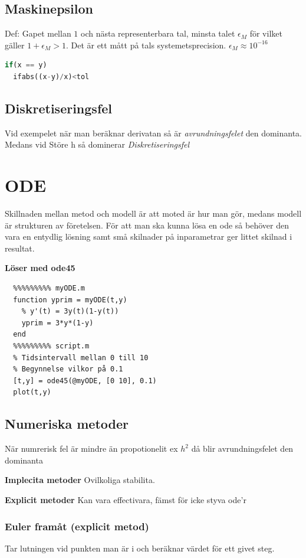 \documentclass{article}
\begin{document}
\subsection{Maskinepsilon}
Def: Gapet mellan $1$ och nästa representerbara tal, minsta talet $\epsilon_M$ för vilket
gäller $1+\epsilon_M > 1$. Det är ett mått på tals systemetsprecision. $\epsilon_M \approx 10^{-16}$

\begin{lstlisting}[language=Python]
  if(x == y)
  ifabs((x-y)/x)<tol
\end{lstlisting}

\subsection{Diskretiseringsfel}
Vid exempelet när man beräknar derivatan så är \textit{avrundningsfelet} den dominanta. Medans
vid Störe h så dominerar \textit{Diskretiseringsfel}

\newpage
\section{ODE}
Skillnaden mellan metod och modell är att moted är hur man gör, 
medans modell är strukturen av företelsen.
För att man ska kunna lösa en ode så behöver den vara en entydlig 
lösning samt små skilnader på inparametrar ger littet skilnad i resultat.

\textbf{Löser med ode45}
\begin{verbatim}
  %%%%%%%%% myODE.m
  function yprim = myODE(t,y)
    % y'(t) = 3y(t)(1-y(t))
    yprim = 3*y*(1-y)
  end
  %%%%%%%%% script.m
  % Tidsintervall mellan 0 till 10
  % Begynnelse vilkor på 0.1
  [t,y] = ode45(@myODE, [0 10], 0.1)
  plot(t,y)
\end{verbatim}

\subsection{Numeriska metoder}
När numrerisk fel är mindre än propotionelit ex $h^2$ då blir avrundningsfelet den dominanta

\textbf{Implecita metoder}
Ovilkoliga stabilita.

\textbf{Explicit metoder}
Kan vara effectivara, fämst för icke styva ode'r
 
\newpage
\subsubsection{Euler framåt (explicit metod)}
Tar lutningen vid punkten man är i och beräknar värdet för ett givet steg.
\end{document}
